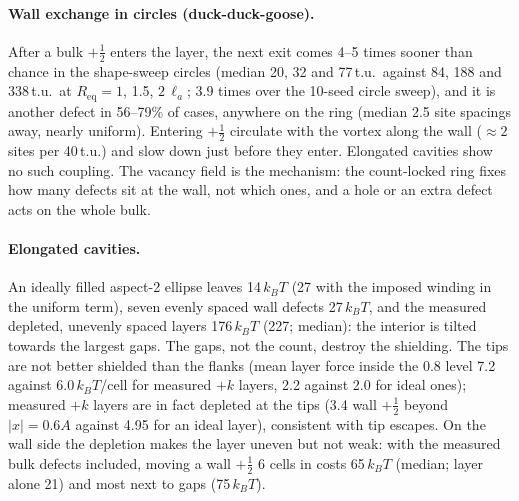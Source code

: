 \documentclass[aps,prl,onecolumn,superscriptaddress,amsmath,amssymb,nofootinbib]{revtex4-2}
\newcommand{\half}{\tfrac12}
\newcommand{\la}{\ell_a}
\newcommand{\kT}{k_BT}
\begin{document}
\paragraph{Wall exchange in circles (duck-duck-goose).} After a bulk $+\half$ enters the layer, the next exit comes 4--5 times sooner than chance in the shape-sweep circles (median 20,
32 and 77\,t.u.\ against 84, 188 and 338\,t.u.\ at $R_\mathrm{eq}=1$, 1.5, $2\,\la$; 3.9 times over the 10-seed circle sweep), and it is another defect in 56--79\% of cases, anywhere on the
ring (median 2.5 site spacings away, nearly uniform). Entering $+\half$ circulate with the vortex along the wall ($\approx2$ sites per 40\,t.u.) and slow down just before they enter.
Elongated cavities show no such coupling. The vacancy field is the mechanism: the count-locked ring fixes how many defects sit at the wall, not which ones, and a hole or an extra
defect acts on the whole bulk.

\paragraph{Elongated cavities.} An ideally filled aspect-2 ellipse leaves 14\,$\kT$ (27 with the imposed winding in the uniform term), seven evenly spaced wall defects 27\,$\kT$, and the
measured depleted, unevenly spaced layers 176\,$\kT$ (227; median): the interior is tilted towards the largest gaps. The gaps, not the count, destroy the shielding. The tips are not
better shielded than the flanks (mean layer force inside the 0.8 level 7.2 against 6.0\,$\kT$/cell for measured $+k$ layers, 2.2 against 2.0 for ideal ones); measured $+k$ layers are in
fact depleted at the tips (3.4 wall $+\half$ beyond $|x|=0.6A$ against 4.95 for an ideal layer), consistent with tip escapes. On the wall side the depletion makes the layer uneven but
not weak: with the measured bulk defects included, moving a wall $+\half$ 6 cells in costs 65\,$\kT$ (median; layer alone 21) and most next to gaps (75\,$\kT$).
\end{document}
